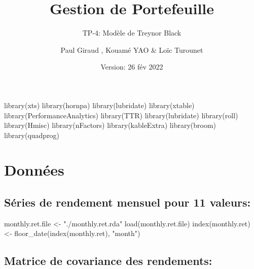 \documentclass[
]{article}
\title{Gestion de Portefeuille}
\subtitle{TP-4: Modèle de Treynor Black}
\author{Paul Giraud , Kouamé YAO \& Loïc Turounet}
\date{Version: 26 fév 2022}
\newenvironment{Shaded}{\begin{snugshade}}{\end{snugshade}}
\newcommand{\FunctionTok}[1]{\textcolor[rgb]{0.00,0.00,0.00}{#1}}
\newcommand{\NormalTok}[1]{#1}
\newcommand{\OtherTok}[1]{\textcolor[rgb]{0.56,0.35,0.01}{#1}}
\newcommand{\StringTok}[1]{\textcolor[rgb]{0.31,0.60,0.02}{#1}}
\begin{document}
\maketitle

\begin{Shaded}
\begin{Highlighting}[]
\FunctionTok{library}\NormalTok{(xts)}
\FunctionTok{library}\NormalTok{(hornpa)}
\FunctionTok{library}\NormalTok{(lubridate)}
\FunctionTok{library}\NormalTok{(xtable)}
\FunctionTok{library}\NormalTok{(PerformanceAnalytics)}
\FunctionTok{library}\NormalTok{(TTR)}
\FunctionTok{library}\NormalTok{(lubridate)}
\FunctionTok{library}\NormalTok{(roll)}
\FunctionTok{library}\NormalTok{(Hmisc)}
\FunctionTok{library}\NormalTok{(nFactors)}
\FunctionTok{library}\NormalTok{(kableExtra)}
\FunctionTok{library}\NormalTok{(broom)}
\FunctionTok{library}\NormalTok{(quadprog)}
\end{Highlighting}
\end{Shaded}

\hypertarget{donnuxe9es}{%
\section{Données}\label{donnuxe9es}}

\hypertarget{suxe9ries-de-rendement-mensuel-pour-11-valeurs}{%
\subsection{Séries de rendement mensuel pour 11
valeurs:}\label{suxe9ries-de-rendement-mensuel-pour-11-valeurs}}

\begin{Shaded}
\begin{Highlighting}[]
\NormalTok{monthly.ret.file }\OtherTok{\textless{}{-}} \StringTok{"./monthly.ret.rda"}
\FunctionTok{load}\NormalTok{(monthly.ret.file)}
\FunctionTok{index}\NormalTok{(monthly.ret) }\OtherTok{\textless{}{-}} \FunctionTok{floor\_date}\NormalTok{(}\FunctionTok{index}\NormalTok{(monthly.ret), }\StringTok{"month"}\NormalTok{)}
\end{Highlighting}
\end{Shaded}

\hypertarget{matrice-de-covariance-des-rendements}{%
\subsection{Matrice de covariance des
rendements:}\label{matrice-de-covariance-des-rendements}}
\end{document}
